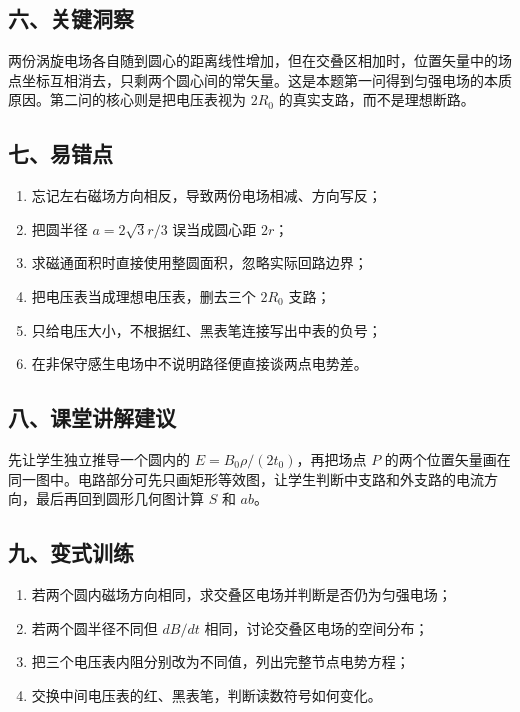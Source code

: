 \documentclass[12pt,a4paper,UTF8]{ctexart}
\newcommand{\tightlist}{\setlength{\itemsep}{0pt}\setlength{\parskip}{0pt}}
\begin{document}
\subsection{六、关键洞察}\label{ux516dux5173ux952eux6d1eux5bdf-1}

两份涡旋电场各自随到圆心的距离线性增加，但在交叠区相加时，位置矢量中的场点坐标互相消去，只剩两个圆心间的常矢量。这是本题第一问得到匀强电场的本质原因。第二问的核心则是把电压表视为
\(2R_0\) 的真实支路，而不是理想断路。

\subsection{七、易错点}\label{ux4e03ux6613ux9519ux70b9-1}

\begin{enumerate}
\def\labelenumi{\arabic{enumi}.}
\tightlist
\item
  忘记左右磁场方向相反，导致两份电场相减、方向写反；
\item
  把圆半径 \(a=2\sqrt3r/3\) 误当成圆心距 \(2r\)；
\item
  求磁通面积时直接使用整圆面积，忽略实际回路边界；
\item
  把电压表当成理想电压表，删去三个 \(2R_0\) 支路；
\item
  只给电压大小，不根据红、黑表笔连接写出中表的负号；
\item
  在非保守感生电场中不说明路径便直接谈两点电势差。
\end{enumerate}

\subsection{八、课堂讲解建议}\label{ux516bux8bfeux5802ux8bb2ux89e3ux5efaux8bae-1}

先让学生独立推导一个圆内的 \(E=B_0\rho/(2t_0)\)，再把场点 \(P\)
的两个位置矢量画在同一图中。电路部分可先只画矩形等效图，让学生判断中支路和外支路的电流方向，最后再回到圆形几何图计算
\(S\) 和 \(ab\)。

\subsection{九、变式训练}\label{ux4e5dux53d8ux5f0fux8badux7ec3-1}

\begin{enumerate}
\def\labelenumi{\arabic{enumi}.}
\tightlist
\item
  若两个圆内磁场方向相同，求交叠区电场并判断是否仍为匀强电场；
\item
  若两个圆半径不同但 \(dB/dt\) 相同，讨论交叠区电场的空间分布；
\item
  把三个电压表内阻分别改为不同值，列出完整节点电势方程；
\item
  交换中间电压表的红、黑表笔，判断读数符号如何变化。
\end{enumerate}
\end{document}
